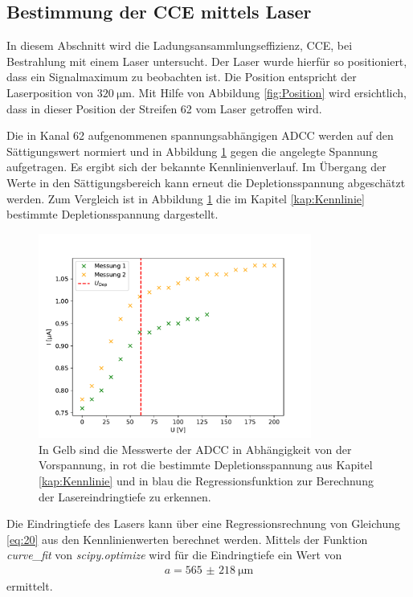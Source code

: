 \subsection{Bestimmung der CCE mittels Laser}
\label{kap:CCEL}
In diesem Abschnitt wird die Ladungsansammlungseffizienz, CCE, bei Bestrahlung mit einem Laser untersucht. Der Laser wurde hierfür so positioniert, dass ein Signalmaximum zu beobachten ist. Die Position entspricht der Laserposition von $\SI{320}{\micro\metre}$. Mit Hilfe von Abbildung \ref{fig:Position} wird ersichtlich, dass in dieser Position der Streifen 62 vom Laser getroffen wird.

Die in Kanal 62 aufgenommenen spannungsabhängigen ADCC werden auf den Sättigungswert normiert und in Abbildung \ref{fig:KennlinieLaser} gegen die angelegte Spannung aufgetragen. Es ergibt sich der bekannte Kennlinienverlauf. Im Übergang der Werte in den Sättigungsbereich kann erneut die Depletionsspannung abgeschätzt werden. Zum Vergleich ist in Abbildung \ref{fig:KennlinieLaser} die im Kapitel \ref{kap:Kennlinie} bestimmte Depletionsspannung dargestellt.
\begin{figure}
  \centering
  \includegraphics[width=0.8\textwidth]{plots/Kennlinie.pdf}
  \caption{In Gelb sind die Messwerte der ADCC in Abhängigkeit von der Vorspannung, in rot die bestimmte Depletionsspannung aus Kapitel \ref{kap:Kennlinie} und in blau die Regressionsfunktion zur Berechnung der Lasereindringtiefe zu erkennen.}
  \label{fig:KennlinieLaser}
\end{figure}
\FloatBarrier
Die Eindringtiefe des Lasers kann über eine Regressionsrechnung von Gleichung \eqref{eq:20} aus den Kennlinienwerten berechnet werden. Mittels der Funktion \textit{curve\_fit} von \textit{scipy.optimize} wird für die Eindringtiefe ein Wert von
\begin{align*}
   a= \SI{565(218)}{\micro\metre}
\end{align*}
ermittelt.

